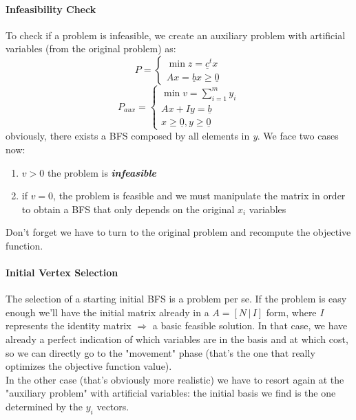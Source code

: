 \documentclass{article}
\begin{document}
				\paragraph{Infeasibility Check}
				To check if a problem is infeasible, we create an auxiliary problem with artificial variables (from the original problem) as:
					\begin{equation}
						P = 
						\begin{cases}
							\min z = \underline{c}^t x\\
							Ax = \underline{b}
							x \geq \underline{0}
						\end{cases}
					\end{equation}
					\begin{equation}
						P_{aux} = 
						\begin{cases}
							\min v = \sum_{i = 1}^m y_i\\
							Ax + Iy= \underline{b}\\
							x \geq \underline{0}, y \geq \underline{0}
						\end{cases}
					\end{equation}
					obviously, there exists a BFS composed by all elements in \emph{y}. We face two cases now:
					\begin{enumerate}
						\item $v > 0$ the problem is \textit{\textbf{infeasible}}
						\item if $v = 0$, the problem is feasible and we must manipulate the matrix in order to obtain a BFS that only depends on the original $x_i$ variables
					\end{enumerate}
					Don't forget we have to turn to the original problem and recompute the objective function.

				\paragraph{Initial Vertex Selection}
					The selection of a starting initial BFS is a problem per se. If the problem is easy enough we'll have the initial matrix already in a $A = [N \,\vert\, I]$ form, where \emph{I} represents the identity matrix $\Rightarrow$ a basic feasible solution. In that case, we have already a perfect indication of which variables are in the basis and at which cost, so we can directly go to the "movement" phase (that's the one that really optimizes the objective function value).\\
					In the other case (that's obviously more realistic) we have to resort again at the "auxiliary problem" with artificial variables: the initial basis we find is the one determined by the $y_i$ vectors.
\end{document}

